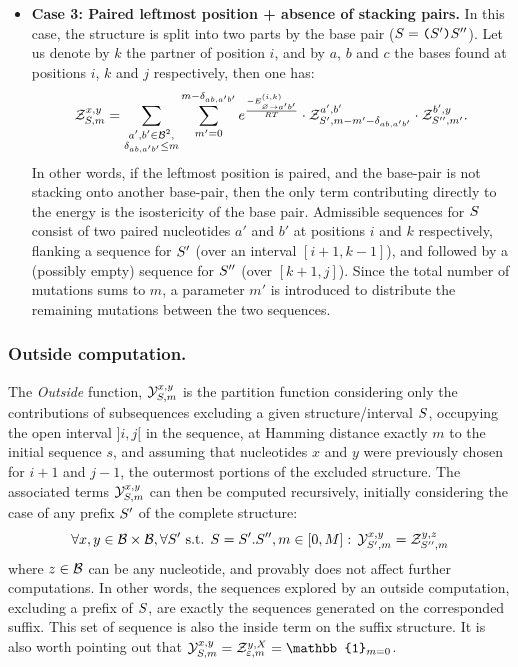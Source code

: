 \begin{itemize}
\item {\bf Case 3: Paired leftmost position + absence of stacking pairs.} In this case, the structure is split into two parts by the base pair ($S = \text{\tt(} S'\text{\tt )}S''$). Let us denote by $k$ the partner of position $i$, and by $a$, $b$ and $c$ the bases found at positions $i$, $k$ and $j$ respectively, then one has:
\begin{equation}
\label{eq:Z_rec_C}
	\mathcal{Z}_{S, m}^{x,y}=\sum_{\substack{a',b'\in \mathcal{B}^2,\\ \delta_{ab, a'b'}\le m}}
      \sum_{m'=0}^{m-\delta_{ab,a'b'}}
   		 e^{\frac{-E^{(i,k)}_{{\varnothing}\to{a'b'}}}{RT}}
      \cdot\mathcal{Z}_{S', m-m'-\delta_{ab,a'b'}}^{a',b'}
      \cdot\mathcal{Z}_{S'', m'}^{b',y}.
\end{equation}
In other words, if the leftmost position is paired, and the base-pair is not stacking onto another base-pair, then the  only term contributing directly to the energy is the isostericity of the base pair. Admissible sequences for $S$ consist of two paired nucleotides $a'$ and $b'$ at positions $i$ and $k$ respectively, flanking a sequence for $S'$ (over an interval $[i+1,k-1]$), and followed by a (possibly empty) sequence for $S''$ (over $[k+1,j]$). Since the total number of mutations sums to $m$, a parameter $m'$ is introduced to distribute the remaining mutations between the two sequences.
\end{itemize}



\subsubsection{Outside computation.}	

The \emph{Outside} function, $\mathcal{Y}_{S, m}^{x,y}$ is the partition function considering only the 
contributions of subsequences excluding a given structure/interval $S$, occupying the open interval $]i,j[$ in the sequence, at Hamming distance exactly $m$ to the initial sequence $s$, and assuming that nucleotides $x$ and $y$ were previously chosen for $i+1$ and $j-1$, the outermost portions of the excluded structure.
The associated terms $\mathcal{Y}_{S, m}^{x,y}$ can then be computed recursively, initially considering the case of any prefix $S'$ of the complete structure:
\begin{equation}
	\forall x,y\in \mathcal{B}\times \mathcal{B}, \forall S'\text{ s.t. }S=S'.S'', m\in [0,M]:\, \mathcal{Y}_{S', m}^{x,y}=\mathcal{Z}_{S'', m}^{y,z}
\label{eq:Y_in}
\end{equation}
where $z\in\mathcal{B}$ can be any nucleotide, and provably does not affect further computations. 
In other words, the sequences explored by an outside computation, excluding a prefix of $S$, are exactly the sequences generated on the corresponded suffix. This set of sequence is also the inside term on the suffix structure.
It is also worth pointing out that $\Y{\Struct}{m}{x,y}= \Z{\varepsilon}{m}{y,X}=\mathbb{1}_{m=0}$.

